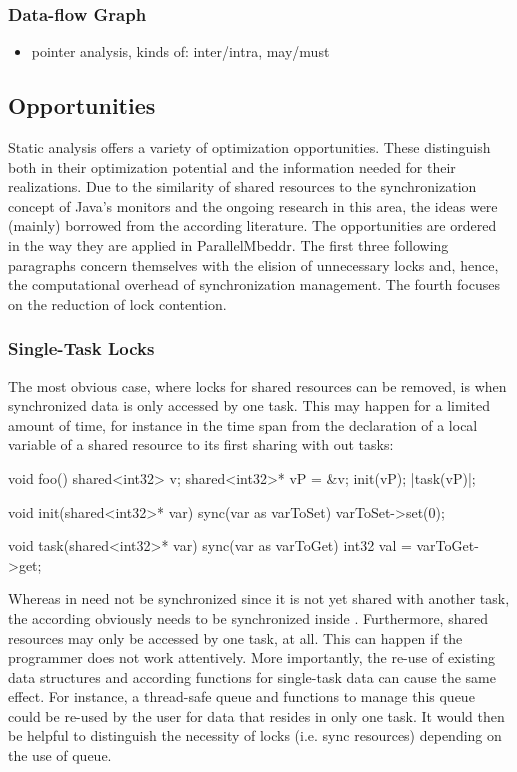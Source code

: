 \subsubsection{Data-flow Graph}
\begin{itemize}
\item pointer analysis, kinds of: inter/intra, may/must
\end{itemize}

\subsection{Opportunities}
Static analysis offers a variety of optimization opportunities. These distinguish both in their optimization potential and the information needed for their realizations. Due to the similarity of shared resources to the synchronization concept of Java's monitors and the ongoing research in this area, the ideas were (mainly) borrowed from the according literature. The opportunities are ordered in the way they are applied in ParallelMbeddr. The first three following paragraphs concern themselves with the elision of unnecessary locks and, hence, the computational overhead of synchronization management. The fourth focuses on the reduction of lock contention.

\subsubsection{Single-Task Locks}
The most obvious case, where locks for shared resources can be removed, is when synchronized data is only accessed by one task. This may happen for a limited amount of time, for instance in the time span from the declaration of a local variable of a shared resource to its first sharing with out tasks:
\begin{ccode}
void foo() {
  shared<int32> v;
  shared<int32>* vP = &v;
  init(vP);
  |task(vP)|;
}

void init(shared<int32>* var) {
  sync(var as varToSet) {
    varToSet->set(0);
  }
}

void task(shared<int32>* var) {
  sync(var as varToGet) {
    int32 val = varToGet->get;
  }
}
\end{ccode}
Whereas  in  need not be synchronized since it is not yet shared with another task, the according  obviously needs to be synchronized inside .
Furthermore, shared resources may only be accessed by one task, at all. This can happen if the programmer does not work attentively. More importantly, the re-use of existing data structures and according functions for single-task data can cause the same effect. For instance, a thread-safe queue and functions to manage this queue could be re-used by the user for data that resides in only one task. It would then be helpful to distinguish the necessity of locks (i.e. sync resources) depending on the use of queue.

